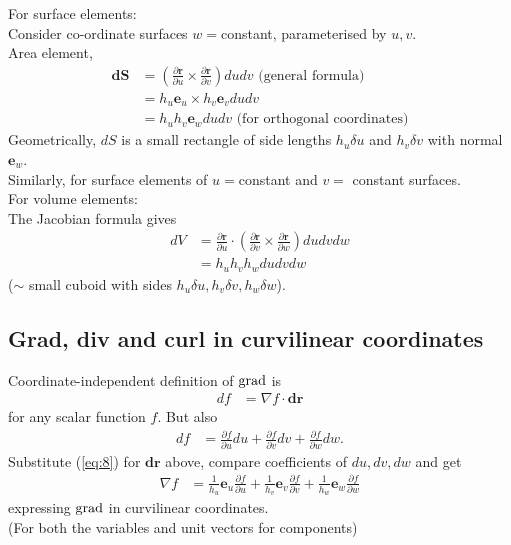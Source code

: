 \documentclass[a4paper]{article}
\begin{document}
For surface elements:\\
Consider co-ordinate surfaces $w=$constant, parameterised by $u,v$.\\
Area element,
\begin{equation*}
\begin{aligned}
\mathbf{dS} &= \left(\frac{\partial \mathbf{r}}{\partial u}\times \frac{\partial \mathbf{r}}{\partial v}\right) dudv \text{  (general formula)}\\
&= h_u\mathbf{e}_u\times h_v\mathbf{e}_v dudv\\
&= h_u h_v \mathbf{e}_w dudv \text{  (for orthogonal coordinates)}
\end{aligned}
\end{equation*}
Geometrically, $dS$ is a small rectangle of side lengths $h_u \delta u$ and $h_v \delta v$ with normal $\mathbf{e}_w$.\\
Similarly, for surface elements of $u=$constant and $v=$ constant surfaces.\\

For volume elements:\\
The Jacobian formula gives
\begin{equation*}
\begin{aligned}
dV&=\frac{\partial \mathbf{r}}{\partial u}\cdot\left(\frac{\partial \mathbf{r}}{\partial v}\times\frac{\partial\mathbf{r}}{\partial w}\right)dudvdw\\
&=h_u h_v h_w dudvdw
\end{aligned}
\end{equation*}
($\sim$ small cuboid with sides $h_u\delta u,h_v\delta v,h_w\delta w$).\\

\subsection{Grad, div and curl in curvilinear coordinates}
Coordinate-independent definition of $\operatorname{grad}$ is
\begin{equation*}
\begin{aligned}
df &= \nabla f \cdot \mathbf{dr}
\end{aligned}
\end{equation*}
for any scalar function $f$. But also
\begin{equation*}
\begin{aligned}
df &= \frac{\partial f}{\partial u}du + \frac{\partial f}{\partial v}dv + \frac{\partial f}{\partial w}dw.
\end{aligned}
\end{equation*}
Substitute (\ref{eq:8}) for $\mathbf{dr}$ above, compare coefficients of $du,dv,dw$ and get
\begin{equation*}
\begin{aligned}
\nabla f &=\frac{1}{h_u}\mathbf{e}_u \frac{\partial f}{\partial u} +\frac{1}{h_v}\mathbf{e}_v \frac{\partial f}{\partial v} +\frac{1}{h_w}\mathbf{e}_w \frac{\partial f}{\partial w}
\end{aligned}
\end{equation*}
expressing $\operatorname{grad}$ in curvilinear coordinates.\\
(For both the variables and unit vectors for components)\\
\end{document}
